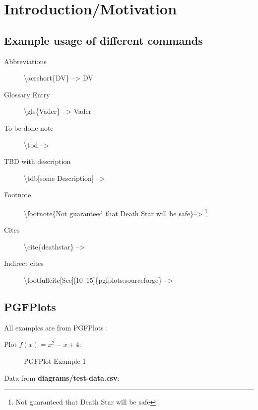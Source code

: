 \chapter{Introduction/Motivation}\label{chp:introduction}
\section{Example usage of different commands}\label{chp:introduction:examples}


 \begin{description}
	\item[Abbreviations] \textbackslash acrshort\{DV\} -->  \acrshort{DV}
	\item[Glossary Entry] \textbackslash gls\{Vader\} -->  \gls{Vader}
	\item[To be done note] \textbackslash tbd --> \tbd
	\item[TBD with description] \textbackslash tdb[some Description] --> 
	\item[Footnote] \textbackslash footnote\{Not guaranteed that Death Star will be safe\}--> \footnote{Not guaranteed that Death Star will be safe}
	\item[Cites] \textbackslash cite\{deathstar\} --> \cite{deathstar}
	\item[Indirect cites] \textbackslash footfullcite[See][10--15]\{pgfplots:sourceforge\} -->  
 \end{description}
 
 
\section{PGFPlots}\label{chp:introduction:pgfexamples}

All examples are from PGFPlots \cite{pgfplots:sourceforge}:

Plot \textbf{$f(x) = x^2 - x +4$}:

\begin{figure}[H]
	\caption[PGFPlot 1]{PGFPlot Example 1}
	\label{fig:pgf:example1}
\end{figure}

Data from \textbf{diagrams/test-data.csv}:

